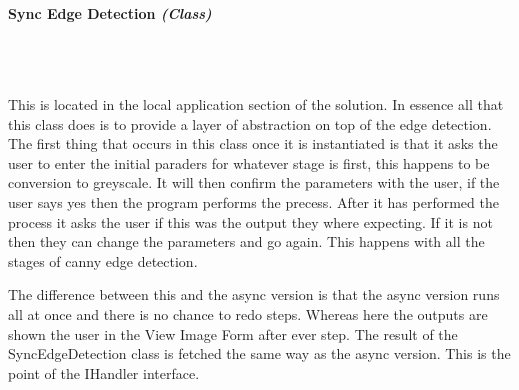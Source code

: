 \begin{FlushLeft}
    \bk

    \pagebreak
\paragraph{Sync Edge Detection \textit{(Class)}} \mbox{} \\

    \begin{figure}[H]
        \centering
    \end{figure}\\

    This is located in the local application section of the solution. In essence all that this class does is to provide a layer of abstraction on top of the edge detection. The first thing that occurs in this class once it is instantiated is that it asks the user to enter the initial paraders for whatever stage is first, this happens to be conversion to greyscale. It will then confirm the parameters with the user, if the user says yes then the program performs the precess. After it has performed the process it asks the user if this was the output they where expecting. If it is not then they can change the parameters and go again. This happens with all the stages of canny edge detection. \\ \bk

    The difference between this and the async version is that the async version runs all at once and there is no chance to redo steps. Whereas here the outputs are shown the user in the View Image Form after ever step. The result of the SyncEdgeDetection class is fetched the same way as the async version. This is the point of the IHandler interface. \\ \bk


\end{FlushLeft}
